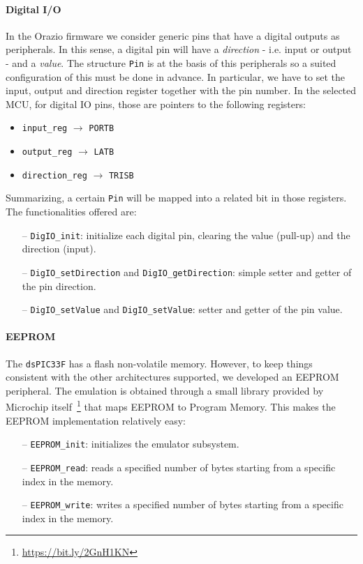\documentclass[10pt,a4paper, notitlepage]{report}
\begin{document}
\paragraph{Digital I/O} In the Orazio firmware we consider generic pins that have a digital outputs as peripherals. In this sense, a digital pin will have a \textit{direction} - i.e. input or output - and a \textit{value}. The structure \texttt{Pin} is at the basis of this peripherals so a suited configuration of this must be done in advance. In particular, we have to set the input, output and direction register together with the pin number. In the selected MCU, for digital IO pins, those are pointers to the following registers:
\begin{itemize}
  \item \texttt{input\_reg} $\rightarrow$ \texttt{PORTB}
  \item \texttt{output\_reg} $\rightarrow$ \texttt{LATB}
  \item \texttt{direction\_reg} $\rightarrow$ \texttt{TRISB}
\end{itemize}
Summarizing, a certain \texttt{Pin} will be mapped into a related bit in those registers. The functionalities offered are:
\begin{itemize}
  \item[--] \texttt{DigIO\_init}: initialize each digital pin, clearing the value (pull-up) and the direction (input).
  \item[--] \texttt{DigIO\_setDirection} and \texttt{DigIO\_getDirection}: simple setter and getter of the pin direction.
  \item[--] \texttt{DigIO\_setValue} and \texttt{DigIO\_setValue}: setter and getter of the pin value.
\end{itemize}
\paragraph{EEPROM} The \texttt{dsPIC33F} has a flash non-volatile memory. However, to keep things consistent with the other architectures supported, we developed an EEPROM peripheral. The emulation is obtained through a small library provided by Microchip itself~\footnote{\href{https://bit.ly/2GnH1KN}{https://bit.ly/2GnH1KN}} that maps EEPROM to Program Memory. This makes the EEPROM implementation relatively easy:
\begin{itemize}
  \item[--] \texttt{EEPROM\_init}: initializes the emulator subsystem.
  \item[--] \texttt{EEPROM\_read}: reads a specified number of bytes starting from a specific index in the memory.
  \item[--] \texttt{EEPROM\_write}: writes a specified number of bytes starting from a specific index in the memory.
\end{itemize}
\end{document}
